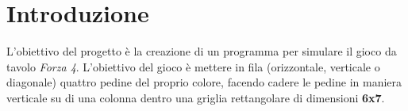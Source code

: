 
\newpage
\thispagestyle{headings}
\section{Introduzione}\label{sec:introduzione}
L'obiettivo del progetto è la creazione di un programma per simulare il gioco da tavolo \textit{Forza 4}.
L'obiettivo del gioco è mettere in fila (orizzontale, verticale o diagonale) quattro pedine del proprio colore,
facendo cadere le pedine in maniera verticale su di una colonna dentro una griglia rettangolare di dimensioni
\textbf{6x7}.